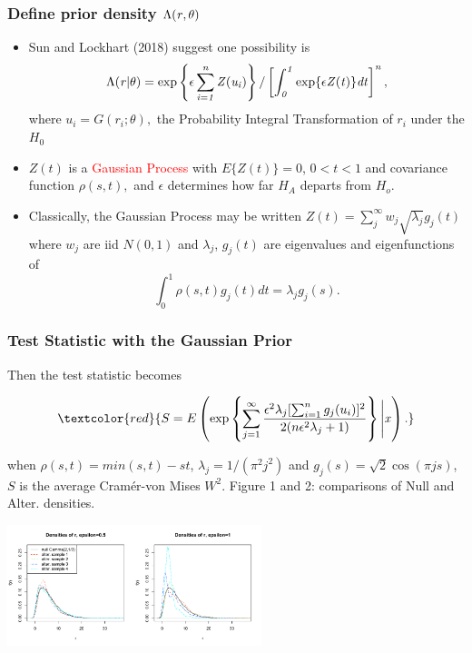 \documentclass{beamer}
\newcommand{\cram}{Cram\'{e}r-von Mises }
\begin{document}
 \frame
{
  \frametitle{Define prior density $\Lambda(\it{r}, \theta)$ }
\begin{itemize}
\item Sun and Lockhart (2018) suggest one possibility is 
$$ \Lambda(\it{r}| \theta) = 
\exp \left\{ \epsilon \sum_{i=1}^n
Z(u_i)\right\}/\left[\int_0^1\exp\{\epsilon Z(t) \}dt\right]^n,  $$
where $u_i=G(r_i; \theta),$ the Probability Integral Transformation 
of $r_i$ under the $H_0$   

\item
$Z(t)$ is a \textcolor{red}{Gaussian Process} with 
$E\{Z(t)\}=0$, $0<t<1$
and covariance function $\rho(s,t),$ 
and $\epsilon$ determines 
how far $H_A$ departs from $H_o$. 
 \item
  Classically, the Gaussian Process may be written 
$Z(t)=\sum_j^\infty w_j \sqrt{\lambda_j} g_j(t)$
where $w_j$ are iid $N(0,1)$ 
and  
$\lambda_j$, $g_j(t)$ are eigenvalues and 
eigenfunctions of 
\begin{equation*}
\label{inteq}
\int_0^1 \rho(s,t)g_j(t)dt=\lambda_j g_j(s).
\end{equation*}

\end{itemize}
}



 \frame
{
  \frametitle{Test Statistic with the Gaussian Prior}
  
   Then the test statistic
becomes 

\begin{equation} 
\label{bayes1}
\textcolor{red}{S=E\left( \exp\left\{ \sum_{j=1}^{\infty}
\frac{\epsilon^2 \lambda_j 
[\sum_{i=1}^n g_j(u_i)]^2}
     {2(n\epsilon^2\lambda_j+1)} \right\}\Bigg|\it{x}\right).}
\end{equation}


 when $\rho(s,t)=min(s,t)-st$, $\lambda_j=1/(\pi^2j^2)$  
and $g_j(s)= \sqrt{2}\cos(\pi js)$, $S$ is the average
 \cram $W^2$. 
 Figure 1 and 2: comparisons of Null and Alter. densities.
 \begin{center}
 \includegraphics[width=20em]{guassplot.pdf}
 \end{center}

 }
 
\end{document}

